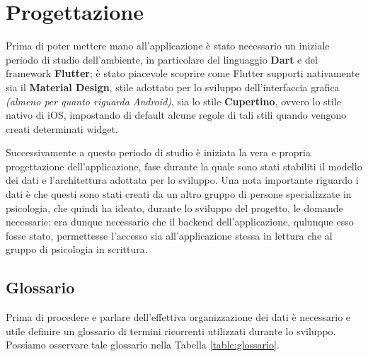 \chapter{Progettazione}
\label{chap:progettazione}
Prima di poter mettere mano all'applicazione è stato necessario un iniziale periodo di studio dell'ambiente, in particolare del linguaggio \textbf{Dart} e del framework \textbf{Flutter}; è stato piacevole scoprire come Flutter supporti nativamente sia il \textbf{Material Design}, stile adottato per lo sviluppo dell'interfaccia grafica \textit{(almeno per quanto riguarda Android)}, sia lo stile \textbf{Cupertino}, ovvero lo stile nativo di iOS, impostando di default alcune regole di tali stili quando vengono creati determinati widget.

Successivamente a questo periodo di studio è iniziata la vera e propria progettazione dell'applicazione, fase durante la quale sono stati stabiliti il modello dei dati e l'architettura adottata per lo sviluppo. Una nota importante riguardo i dati è che questi sono stati creati da un altro gruppo di persone specializzate in psicologia, che quindi ha ideato, durante lo sviluppo del progetto, le domande necessarie: era dunque necessario che il backend dell'applicazione, qulunque esso fosse stato, permettesse l'accesso sia all'applicazione stessa in lettura che al gruppo di psicologia in scrittura.

\newpage

\section{Glossario}
Prima di procedere e parlare dell'effettiva organizzazione dei dati è necessario e utile definire un glossario di termini ricorrenti utilizzati durante lo sviluppo. Possiamo osservare tale glossario nella Tabella \ref{table:glossario}.



